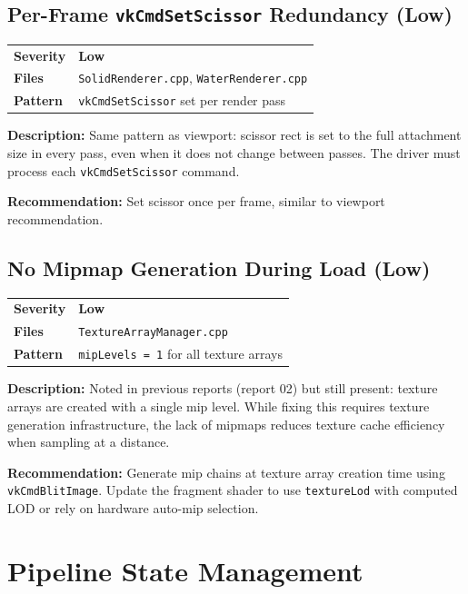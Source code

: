 \documentclass[a4paper,10pt]{article}
\newcommand{\severity}[1]{%
  \ifstrequal{#1}{Critical}{\textcolor{critical}{\textbf{#1}}}{%
  \ifstrequal{#1}{High}{\textcolor{high}{\textbf{#1}}}{%
  \ifstrequal{#1}{Medium}{\textcolor{medium}{\textbf{#1}}}{%
  \ifstrequal{#1}{Low}{\textcolor{low}{\textbf{#1}}}{#1}}}}}
\begin{document}
\subsection{Per-Frame \texttt{vkCmdSetScissor} Redundancy (Low)}

\begin{tabular}{ll}
\textbf{Severity} & \severity{Low} \\
\textbf{Files}     & \texttt{SolidRenderer.cpp}, \texttt{WaterRenderer.cpp} \\
\textbf{Pattern}   & \texttt{vkCmdSetScissor} set per render pass \\
\end{tabular}

\vspace{0.5em}
\noindent
\textbf{Description:} Same pattern as viewport: scissor rect is set to the
full attachment size in every pass, even when it does not change between
passes. The driver must process each \texttt{vkCmdSetScissor} command.

\noindent\textbf{Recommendation:} Set scissor once per frame, similar to
viewport recommendation.

\subsection{No Mipmap Generation During Load (Low)}

\begin{tabular}{ll}
\textbf{Severity} & \severity{Low} \\
\textbf{Files}     & \texttt{TextureArrayManager.cpp} \\
\textbf{Pattern}   & \texttt{mipLevels = 1} for all texture arrays \\
\end{tabular}

\vspace{0.5em}
\noindent
\textbf{Description:} Noted in previous reports (report 02) but still present:
texture arrays are created with a single mip level. While fixing this requires
texture generation infrastructure, the lack of mipmaps reduces texture cache
efficiency when sampling at a distance.

\noindent\textbf{Recommendation:} Generate mip chains at texture array creation
time using \texttt{vkCmdBlitImage}. Update the fragment shader to use
\texttt{textureLod} with computed LOD or rely on hardware auto-mip selection.

\section{Pipeline State Management}
\end{document}
